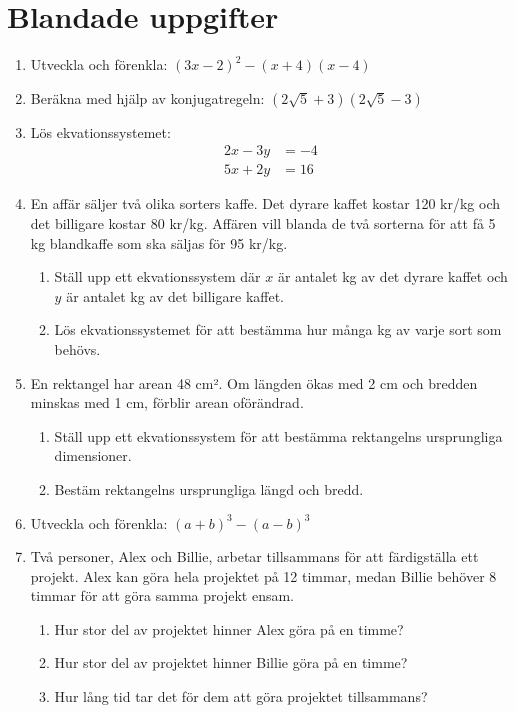 \documentclass[a4paper,11pt]{article}
\begin{document}
\section{Blandade uppgifter}

\begin{enumerate}[label=\textbf{\arabic*.}]
    \item Utveckla och förenkla: $(3x - 2)^2 - (x + 4)(x - 4)$
    
    \item Beräkna med hjälp av konjugatregeln: $(2\sqrt{5} + 3)(2\sqrt{5} - 3)$
    
    \item Lös ekvationssystemet:
    \begin{align*}
    2x - 3y &= -4\\
    5x + 2y &= 16
    \end{align*}
    
    \item En affär säljer två olika sorters kaffe. Det dyrare kaffet kostar 120 kr/kg och det billigare kostar 80 kr/kg. Affären vill blanda de två sorterna för att få 5 kg blandkaffe som ska säljas för 95 kr/kg.
    \begin{enumerate}[label=\alph*)]
        \item Ställ upp ett ekvationssystem där $x$ är antalet kg av det dyrare kaffet och $y$ är antalet kg av det billigare kaffet.
        \item Lös ekvationssystemet för att bestämma hur många kg av varje sort som behövs.
    \end{enumerate}
    
    \item En rektangel har arean 48 cm². Om längden ökas med 2 cm och bredden minskas med 1 cm, förblir arean oförändrad.
    \begin{enumerate}[label=\alph*)]
        \item Ställ upp ett ekvationssystem för att bestämma rektangelns ursprungliga dimensioner.
        \item Bestäm rektangelns ursprungliga längd och bredd.
    \end{enumerate}
    
    \item Utveckla och förenkla: $(a + b)^3 - (a - b)^3$
    
    \item Två personer, Alex och Billie, arbetar tillsammans för att färdigställa ett projekt. Alex kan göra hela projektet på 12 timmar, medan Billie behöver 8 timmar för att göra samma projekt ensam.
    \begin{enumerate}[label=\alph*)]
        \item Hur stor del av projektet hinner Alex göra på en timme?
        \item Hur stor del av projektet hinner Billie göra på en timme?
        \item Hur lång tid tar det för dem att göra projektet tillsammans?
    \end{enumerate}
\end{enumerate}
\end{document}
